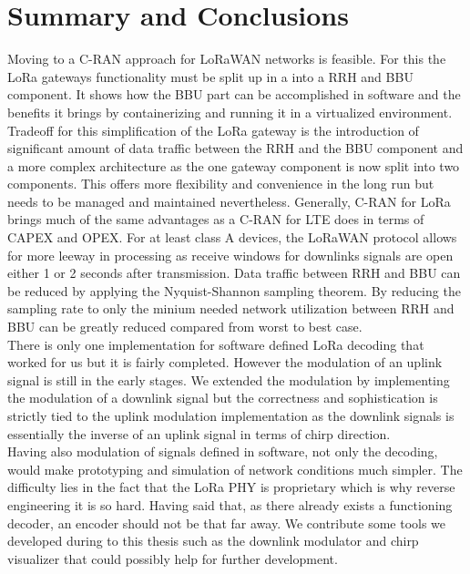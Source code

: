\chapter{Summary and Conclusions}
Moving to a C-RAN approach for LoRaWAN networks is feasible. For this
the LoRa gateways functionality must be split up in a into a RRH and BBU component.
It shows how the BBU part can be accomplished in software and the benefits it brings
by containerizing and running it in a virtualized environment. Tradeoff for this 
simplification of the LoRa gateway is the introduction of significant amount of data traffic between
the RRH and the BBU component and a more complex architecture as the one gateway component is now 
split into two components. This offers more flexibility and convenience in the long run but needs to 
be managed and maintained nevertheless. Generally, C-RAN for LoRa brings much of the same advantages as 
a C-RAN for LTE does in terms of CAPEX and OPEX. For at least class A devices, the LoRaWAN protocol allows for more leeway in 
processing as receive windows for downlinks signals are open either 1 or 2 seconds after transmission.
Data traffic between RRH and BBU can be reduced by applying the Nyquist-Shannon sampling theorem. 
By reducing the sampling rate to only the minium needed network utilization between RRH and BBU 
can be greatly reduced compared from worst to best case.\\
There is only one implementation for software defined LoRa decoding that worked for us but it is fairly completed.
However the modulation of an uplink signal is still in the early stages. We extended the modulation by 
implementing the modulation of a downlink signal but the correctness and sophistication is strictly tied to 
the uplink modulation implementation as the downlink signals is essentially the inverse of an uplink signal in terms of 
chirp direction.
\\
Having also modulation of signals defined in software, not only the decoding, would make prototyping and simulation
of network conditions much simpler. The difficulty lies in the fact that the LoRa PHY is proprietary which is why reverse 
engineering it is so hard. Having said that, as there already exists a functioning decoder, an encoder should not be that far 
away. We contribute some tools we developed during to this thesis such as the downlink modulator and chirp visualizer that could
possibly help for further development. 